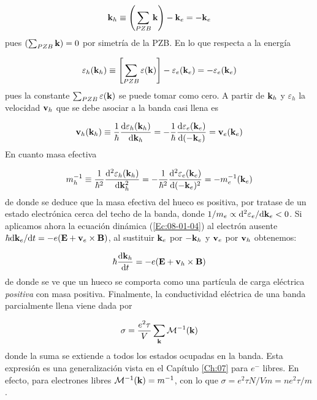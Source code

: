 \begin{equation}
	\mathbf{k}_h \equiv \left( \sum_{PZB} \mathbf{k} \right) - \mathbf{k}_e = - \mathbf{k}_e
\end{equation}
pues $\left( \sum_{PZB} \mathbf{k} \right) =0$ por simetría de la PZB. En lo que respecta a la energía 

\begin{equation}
	\varepsilon_h (\mathbf{k}_h) \equiv \left[ \sum_{PZB} \varepsilon(\mathbf{k})  \right] - \varepsilon_e (\mathbf{k}_e) = - \varepsilon_e (\mathbf{k}_e)
\end{equation}
pues la constante $\sum_{PZB} \varepsilon(\mathbf{k})$ se puede tomar como cero. A partir de $\mathbf{k}_h$ y $\varepsilon_h$ la velocidad $\mathbf{v}_h$ que se debe asociar a la banda casi llena es 
 
\begin{equation}
	\mathbf{v}_h (\mathbf{k}_h) \equiv \frac{1}{\hbar} \frac{\mathrm{d} \varepsilon_h (\mathbf{k}_h)}{\mathrm{d} \mathbf{k}_h} = - \frac{1}{\hbar} \frac{\mathrm{d} \varepsilon_e (\mathbf{k}_e)}{\mathrm{d} (-\mathbf{k}_e)} = \mathbf{v}_e (\mathbf{k}_e)
\end{equation}
En cuanto masa efectiva

\begin{equation}
	m_h^{-1} \equiv \frac{1}{\hbar^2} \frac{\mathrm{d} ^2\varepsilon_h (\mathbf{k}_h)}{\mathrm{d} \mathbf{k}_h^2} = - \frac{1}{\hbar^2} \frac{\mathrm{d} ^2\varepsilon_e (\mathbf{k}_e)}{\mathrm{d} (-\mathbf{k}_e)^2} = - m_e^{-1}(\mathbf{k}_e)
\end{equation}
de donde se deduce que la masa efectiva del hueco es positiva, por tratase de un estado electrónica cerca del techo de la banda, donde $1/m_e \propto \mathrm{d}^2 \varepsilon_e / \mathrm{d} \mathbf{k}_e <0$. Si aplicamos ahora la ecuación dinámica (\ref{Ec:08-01-04}) al electrón ausente $\hbar \mathrm{d} \mathbf{k}_e / \mathrm{d} t = - e (\mathbf{E} + \mathbf{v}_e \times \mathbf{B})$, al sustituir $\mathbf{k}_e$ por $-\mathbf{k}_h$ y $\mathbf{v}_e$ por $\mathbf{v}_h$ obtenemos:

\begin{equation}
	\hbar \frac{\mathrm{d} \mathbf{k}_h}{\mathrm{d} t} = - e (\mathbf{E} + \mathbf{v}_h \times \mathbf{B})
\end{equation}
de donde se ve que un hueco se comporta como una partícula de carga eléctrica \textit{positiva} con masa positiva. Finalmente, la conductividad eléctrica de una banda parcialmente llena viene dada por

\begin{equation}
	\sigma = \frac{e^2 \tau}{V} \sum_{\mathbf{k}} \mathcal{M}^{-1} (\mathbf{k})
\end{equation}
donde la suma se extiende a todos los estados ocupadas en la banda. Esta expresión es una generalización vista en el Capítulo \ref{Ch:07} para $e^-$ libres. En efecto, para electrones libres $\mathcal{M}^{-1} (\mathbf{k}) = m^{-1}$, con lo que $\sigma = e^2 \tau N / V m = ne^2 \tau / m$.



